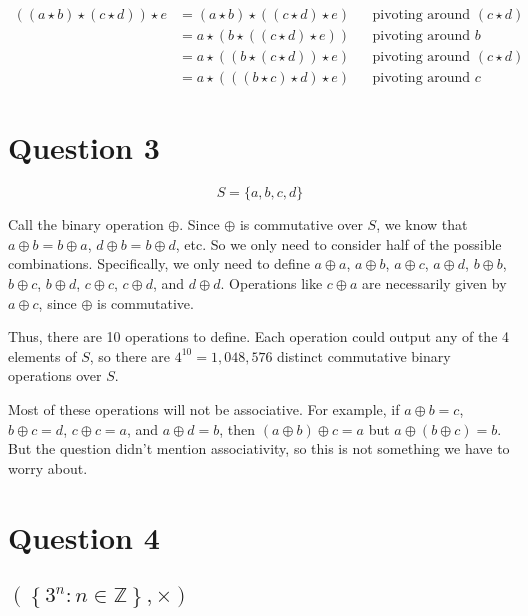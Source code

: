 \documentclass[a4paper]{article}
\begin{document}
\begin{align*}
	((a \star b) \star (c \star d)) \star e &= (a \star b) \star ((c \star d) \star e) &&\text{pivoting around } (c \star d) \\[1ex]
											&= a \star (b \star ((c \star d) \star e)) &&\text{pivoting around } b \\[1ex]
											&= a \star ((b \star (c \star d)) \star e) &&\text{pivoting around } (c \star d) \\[1ex]
											&= a \star (((b \star c) \star d) \star e) &&\text{pivoting around } c
\end{align*}


\section*{Question 3}

$$S = \{a, b, c, d\}$$

Call the binary operation $\oplus$. Since $\oplus$ is commutative over $S$, we know that $a \oplus b = b \oplus a$, $d \oplus b = b \oplus d$, etc. So we only need to consider half of the possible combinations. Specifically, we only need to define $a \oplus a$, $a \oplus b$, $a \oplus c$, $a \oplus d$, $b \oplus b$, $b \oplus c$, $b \oplus d$, $c \oplus c$, $c \oplus d$, and $d \oplus d$. Operations like $c \oplus a$ are necessarily given by $a \oplus c$, since $\oplus$ is commutative.

Thus, there are 10 operations to define. Each operation could output any of the 4 elements of $S$, so there are $4^{10} = 1,048,576$ distinct commutative binary operations over $S$.

Most of these operations will not be associative. For example, if $a \oplus b = c$, $b \oplus c = d$, $c \oplus c = a$, and $a \oplus d = b$, then $(a \oplus b) \oplus c = a$ but $a \oplus (b \oplus c) = b$. But the question didn't mention associativity, so this is not something we have to worry about.


\section*{Question 4}
\setcounter{section}{4}
\setcounter{subsection}{0}

\subsection{$\left( \left\{ 3^n : n \in \mathbb Z \right\}, \times \right)$}
\end{document}
